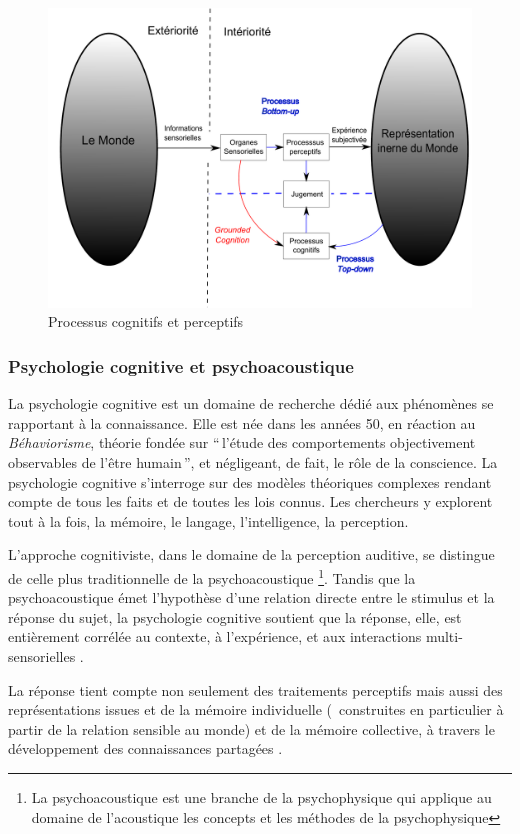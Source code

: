 \begin{figure}[t]
        \myfloatalign
        \includegraphics[width=.8\linewidth]{gfx/Representation}
        \caption{Processus cognitifs et perceptifs}\label{fig:processusPercepAndCo}
\end{figure}

\subsubsection{Psychologie cognitive et psychoacoustique}

La psychologie cognitive est un domaine de recherche dédié aux phénomènes se rapportant à la connaissance. Elle est née dans les années 50, en réaction au \emph{Béhaviorisme}, théorie fondée sur ``\,l'étude des comportements objectivement observables de l'être humain\,'', et négligeant, de fait, le rôle de la conscience. La psychologie cognitive s'interroge sur des modèles théoriques complexes rendant compte de tous les faits et de toutes les lois connus. Les chercheurs y explorent tout à la fois, la mémoire, le langage, l'intelligence, la perception.
 
L'approche cognitiviste, dans le domaine de la perception auditive, se distingue de celle plus traditionnelle de la psychoacoustique \footnote{La psychoacoustique est une branche de la psychophysique qui applique au domaine de l'acoustique les concepts et les méthodes de la psychophysique}. Tandis que la psychoacoustique émet l'hypothèse d'une relation directe entre le stimulus et la réponse du sujet, la psychologie cognitive soutient que la réponse, elle, est entièrement corrélée au contexte, à l'expérience, et aux interactions multi-sensorielles \citep{maffiolo_marieParis_1997}.

La réponse tient compte non seulement des traitements perceptifs mais aussi des représentations issues et de la mémoire individuelle (\ie~construites en particulier à partir de la relation sensible au monde) et de la mémoire collective, à travers le développement des connaissances partagées \citep[p. ??]{maffiolo_caracterisation_1999}.

